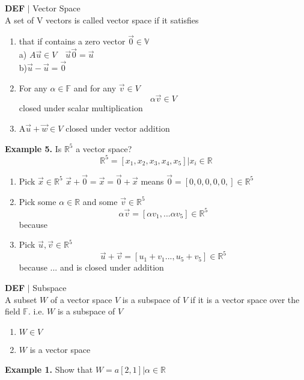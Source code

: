 \documentclass [12pt]{article}
\begin{document}
\begin{framed}
\textbf{DEF} $|$ Vector Space\\
A set of V vectors is called vector space if it satisfies 
\begin{enumerate}
    \item that if contains a zero vector $\overrightarrow{0}\in\mathbb{V}$\\
    a) $A\overrightarrow{u}\in V\quad \overrightarrow{u}\overrightarrow{0} = \overrightarrow{u}$\\
    b)$\overrightarrow{u} - \overrightarrow{u} = \overrightarrow{0}$
    \item For any $\alpha \in\mathbb{F}$ and for any $\overrightarrow{v}\in V$
    \[\alpha \overrightarrow{v}\in V\]
    closed under scalar multiplication
    \item A$\overrightarrow{u} + \overrightarrow{w}\in V$
    closed under vector addition
\end{enumerate}
\end{framed}
\textbf{Example 5. } Is $\mathbb{R}^5$ a vector space?
\[\mathbb{R}^5 = {[x_1,x_2,x_3,x_4,x_5]|x_i\in\mathbb{R}}\]
\begin{enumerate}
    \item Pick $\overrightarrow{x}\in\mathbb{R}^5$
    $\overrightarrow{x} + \overrightarrow{0} =\overrightarrow{x} = \overrightarrow{0}+\overrightarrow{x}$ means $\overrightarrow{0}=[0,0,0,0,0,]\in\mathbb{R}^5$
    \item Pick some $\alpha \in\mathbb{R}$ and some $\overrightarrow{v}\in\mathbb{R}^5$
    \[\alpha \overrightarrow{v}=[\alpha v_1,... \alpha v_5] \in\mathbb{R}^5\]
    because 
    \item Pick $\overrightarrow{u},\overrightarrow{v}\in\mathbb{R}^5$
    \[\overrightarrow{u}+\overrightarrow{v}=[u_1+v_1...,u_5+v_5]\in\mathbb{R}^5\]
    because ... and is closed under addition
\end{enumerate}
\begin{framed}
\noindent\textbf{DEF} $|$ Subspace\\
A subset $W$ of a vector space $V$ is a subspace of $V$ if it is a vector space over the field $\mathbb{F}$. i.e. $W$ is a subspace of $V$
\begin{enumerate}
    \item $W\in V$
    \item $W$ is a vector space
\end{enumerate}
\end{framed}
\noindent\textbf{Example 1. } Show that $W={a[2,1]|\alpha\in\mathbb{R}}$\\
\end{document}
